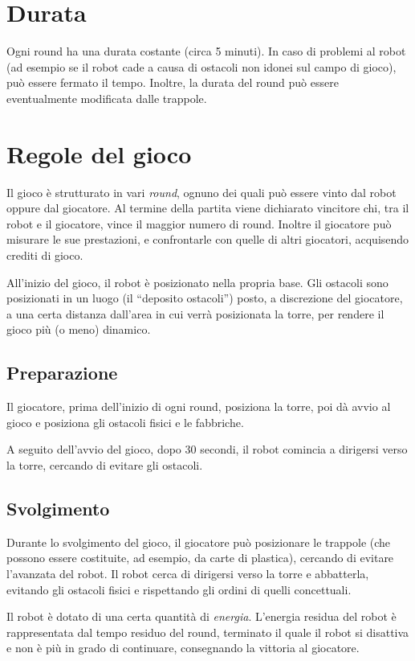 \section{Durata} 
Ogni round ha una durata costante (circa 5 minuti). In caso di problemi al robot (ad esempio se il robot cade a causa di ostacoli non idonei sul campo di gioco), può essere fermato il tempo. Inoltre, la durata del round può essere eventualmente modificata dalle trappole.

\section{Regole del gioco} 
Il gioco è strutturato in vari \emph{round}, ognuno dei quali può essere vinto dal robot oppure dal giocatore. Al termine della partita viene dichiarato vincitore chi, tra il robot e il giocatore, vince il maggior numero di round. Inoltre il giocatore può misurare le sue prestazioni, e confrontarle con quelle di altri giocatori, acquisendo crediti di gioco.

All'inizio del gioco, il robot è posizionato nella propria base. Gli ostacoli sono posizionati in un luogo (il ``deposito ostacoli'') posto, a discrezione del giocatore, a una certa distanza dall'area in cui verrà posizionata la torre, per rendere il gioco più (o meno) dinamico.


	\subsection*{Preparazione}
Il giocatore, prima dell'inizio di ogni round, posiziona la torre, poi dà avvio al gioco e posiziona gli ostacoli fisici e le fabbriche.

A seguito dell'avvio del gioco, dopo 30 secondi, il robot comincia a dirigersi verso la torre, cercando di evitare gli ostacoli.
	
	\subsection*{Svolgimento}
	Durante lo svolgimento del gioco, il giocatore può posizionare le trappole (che possono essere costituite, ad esempio, da carte di plastica), cercando di evitare l'avanzata del robot. Il robot cerca di dirigersi verso la torre e abbatterla, evitando gli ostacoli fisici e rispettando gli ordini di quelli concettuali.

Il robot è dotato di una certa quantità di \emph{energia}. L'energia residua del robot è rappresentata dal tempo residuo del round, terminato il quale il robot si disattiva e non è più in grado di continuare, consegnando la vittoria al giocatore.

